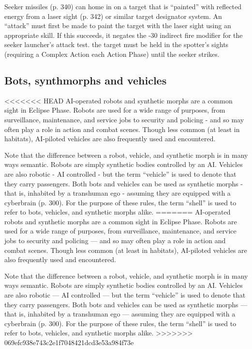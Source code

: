 Seeker missiles (p. 340) can home in on a target that is ``painted'' with reflected energy from a laser sight (p. 342) or similar target designator system. An ``attack'' must first be made to paint the target with the laser sight using an appropriate skill. If this succeeds, it negates the -30 indirect fire modifier for the seeker launcher’s attack test. the target must be held in the spotter’s sights (requiring a Complex Action each Action Phase) until the seeker strikes.


\subsection{Bots, synthmorphs and vehicles}
\label{sec:bots-synthmorphs-vehicles}

<<<<<<< HEAD
AI-operated robots and synthetic morphs are a common sight in Eclipse Phase. Robots are used for a wide range of purposes, from surveillance, maintenance, and service jobs to security and policing - and so may often play a role in action and combat scenes. Though less common (at least in habitats), AI-piloted vehicles are also frequently used and encountered.

Note that the difference between a robot, vehicle, and synthetic morph is in many ways semantic. Robots are simply synthetic bodies controlled by an AI. Vehicles are also robotic - AI controlled - but the term ``vehicle'' is used to denote that they carry passengers. Both bots and vehicles can be used as synthetic morphs - that is, inhabited by a transhuman ego - assuming they are equipped with a cyberbrain (p. 300). For the purpose of these rules, the term ``shell'' is used to refer to bots, vehicles, and synthetic morphs alike.
=======
AI-operated robots and synthetic morphs are a common sight in Eclipse Phase. Robots are used for a wide range of purposes, from surveillance, maintenance, and service jobs to security and policing --- and so may often play a role in action and combat scenes. Though less common (at least in habitats), AI-piloted vehicles are also frequently used and encountered.

Note that the difference between a robot, vehicle, and synthetic morph is in many ways semantic. Robots are simply synthetic bodies controlled by an AI. Vehicles are also robotic --- AI controlled --- but the term ``vehicle'' is used to denote that they carry passengers. Both bots and vehicles can be used as synthetic morphs --- that is, inhabited by a transhuman ego --- assuming they are equipped with a cyberbrain (p. 300). For the purpose of these rules, the term ``shell'' is used to refer to bots, vehicles, and synthetic morphs alike.
>>>>>>> 069efc938e743c2e1f7048421dcd3e53a984f73e

